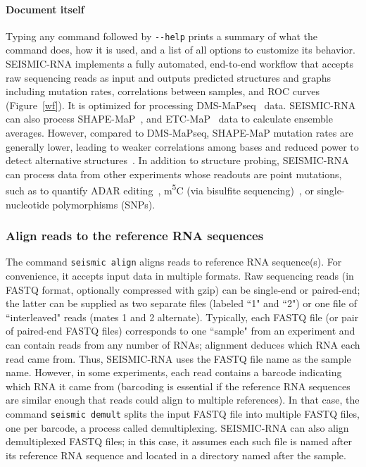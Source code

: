 \documentclass[unnumsec,webpdf,contemporary,large]{oup-authoring-template}%
\theoremstyle{thmstyleone}%
\theoremstyle{thmstyletwo}%
\theoremstyle{thmstylethree}%
\begin{document}
\paragraph{Document itself}
Typing any command followed by \verb|--help| prints a summary of what the command does, how it is used, and a list of all options to customize its behavior.
\\

SEISMIC-RNA implements a fully automated, end-to-end workflow that accepts raw sequencing reads as input and outputs predicted structures and graphs including mutation rates, correlations between samples, and ROC curves (Figure~\ref{wf}).
It is optimized for processing DMS-MaPseq~\cite{Zubradt2016} data.
SEISMIC-RNA can also process SHAPE-MaP~\cite{Siegfried2014}, and ETC-MaP~\cite{Douds2024} data to calculate ensemble averages.
However, compared to DMS-MaPseq, SHAPE-MaP mutation rates are generally lower, leading to weaker correlations among bases and reduced power to detect alternative structures~\cite{Mitchell2023}.
In addition to structure probing, SEISMIC-RNA can process data from other experiments whose readouts are point mutations, such as to quantify ADAR editing~\cite{Okada2019,Shin2026}, m\textsuperscript{5}C (via bisulfite sequencing)~\cite{Schaefer2008}, or single-nucleotide polymorphisms (SNPs).

\subsubsection{Align reads to the reference RNA sequences}

The command \verb|seismic align| aligns reads to reference RNA sequence(s).
For convenience, it accepts input data in multiple formats.
Raw sequencing reads (in FASTQ format, optionally compressed with gzip) can be single-end or paired-end; the latter can be supplied as two separate files (labeled ``1" and ``2") or one file of ``interleaved" reads (mates 1 and 2 alternate).
Typically, each FASTQ file (or pair of paired-end FASTQ files) corresponds to one ``sample" from an experiment and can contain reads from any number of RNAs; alignment deduces which RNA each read came from.
Thus, SEISMIC-RNA uses the FASTQ file name as the sample name.
However, in some experiments, each read contains a barcode indicating which RNA it came from (barcoding is essential if the reference RNA sequences are similar enough that reads could align to multiple references).
In that case, the command \verb|seismic demult| splits the input FASTQ file into multiple FASTQ files, one per barcode, a process called demultiplexing.
SEISMIC-RNA can also align demultiplexed FASTQ files; in this case, it assumes each such file is named after its reference RNA sequence and located in a directory named after the sample.
\end{document}
